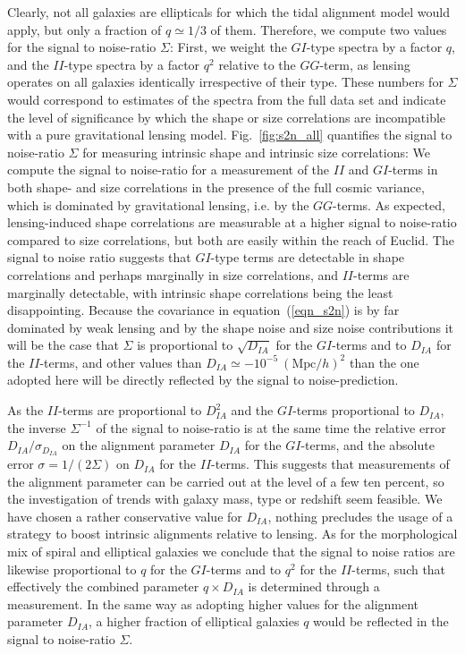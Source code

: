 \documentclass[a4paper,fleqn,usenatbib]{mnras}
\begin{document}
Clearly, not all galaxies are ellipticals for which the tidal alignment model would apply, but only a fraction of $q\simeq 1/3$ of them. Therefore, we compute two values for the signal to noise-ratio $\Sigma$: First, we weight the $GI$-type spectra by a factor $q$, and the $II$-type spectra by a factor $q^2$ relative to the $GG$-term, as lensing operates on all galaxies identically irrespective of their type. These numbers for $\Sigma$ would correspond to estimates of the spectra from the full data set and indicate the level of significance by which the shape or size correlations are incompatible with a pure gravitational lensing model. Fig.~\ref{fig:s2n_all} quantifies the signal to noise-ratio $\Sigma$ for measuring intrinsic shape and intrinsic size correlations: We compute the signal to noise-ratio for a measurement of the $II$ and $GI$-terms in both shape- and size correlations in the presence of the full cosmic variance, which is dominated by gravitational lensing, i.e. by the $GG$-terms. As expected, lensing-induced shape correlations are measurable at a higher signal to noise-ratio compared to size correlations, but both are easily within the reach of Euclid. The signal to noise ratio suggests that $GI$-type terms are detectable in shape correlations and perhaps marginally in size correlations, and $II$-terms are marginally detectable, with intrinsic shape correlations being the least disappointing. Because the covariance in equation~(\ref{eqn_s2n}) is by far dominated by weak lensing and by the shape noise and size noise contributions it will be the case that $\Sigma$ is proportional to $\sqrt{D_{IA}}$ for the $GI$-terms and to $D_{IA}$ for the $II$-terms, and other values than $D_{IA}\simeq -10^{-5}~(\mathrm{Mpc}/h)^2$ than the one adopted here will be directly reflected by the signal to noise-prediction. 

As the $II$-terms are proportional to $D_{IA}^2$ and the $GI$-terms proportional to $D_{IA}$, the inverse $\Sigma^{-1}$ of the signal to noise-ratio is at the same time the relative error $D_{IA}/\sigma_{D_{IA}}$ on the alignment parameter $D_{IA}$ for the $GI$-terms, and the absolute error $\sigma = 1/(2\Sigma)$ on $D_{IA}$ for the $II$-terms. This suggests that measurements of the alignment parameter can be carried out at the level of a few ten percent, so the investigation of trends with galaxy mass, type or redshift seem feasible. We have chosen a rather conservative value for $D_{IA}$, nothing precludes the usage of a strategy to boost intrinsic alignments relative to lensing. As for the morphological mix of spiral and elliptical galaxies we conclude that the signal to noise ratios are likewise proportional to $q$ for the $GI$-terms and to $q^2$ for the $II$-terms, such that effectively the combined parameter $q\times D_{IA}$ is determined through a measurement. In the same way as adopting higher values for the alignment parameter $D_{IA}$, a higher fraction of elliptical galaxies $q$ would be reflected in the signal to noise-ratio $\Sigma$.
\end{document}
